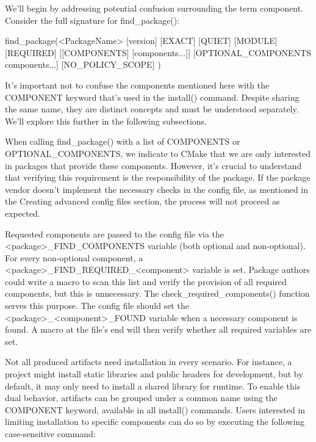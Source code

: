 
We’ll begin by addressing potential confusion surrounding the term component. Consider the full signature for find\_package():

\begin{shell}
find_package(<PackageName>
            [version] [EXACT] [QUIET] [MODULE] [REQUIRED]
            [[COMPONENTS] [components...]]
            [OPTIONAL_COMPONENTS components...]
            [NO_POLICY_SCOPE]
)
\end{shell}

It’s important not to confuse the components mentioned here with the COMPONENT keyword that’s used in the install() command. Despite sharing the same name, they are distinct concepts and must be understood separately. We’ll explore this further in the following subsections.


When calling find\_package() with a list of COMPONENTS or OPTIONAL\_COMPONENTS, we indicate to CMake that we are only interested in packages that provide these components. However, it’s crucial to understand that verifying this requirement is the responsibility of the package. If the package vendor doesn’t implement the necessary checks in the config file, as mentioned in the Creating advanced config files section, the process will not proceed as expected.

Requested components are passed to the config file via the <package>\_FIND\_COMPONENTS variable (both optional and non-optional). For every non-optional component, a <package>\_FIND\_REQUIRED\_<component> variable is set. Package authors could write a macro to scan this list and verify the provision of all required components, but this is unnecessary. The check\_required\_components() function serves this purpose. The config file should set the <package>\_<component>\_FOUND variable when a necessary component is found. A macro at the file’s end will then verify whether all required variables are set.


Not all produced artifacts need installation in every scenario. For instance, a project might install static libraries and public headers for development, but by default, it may only need to install a shared library for runtime. To enable this dual behavior, artifacts can be grouped under a common name using the COMPONENT keyword, available in all install() commands. Users interested in limiting installation to specific components can do so by executing the following case-sensitive command:

